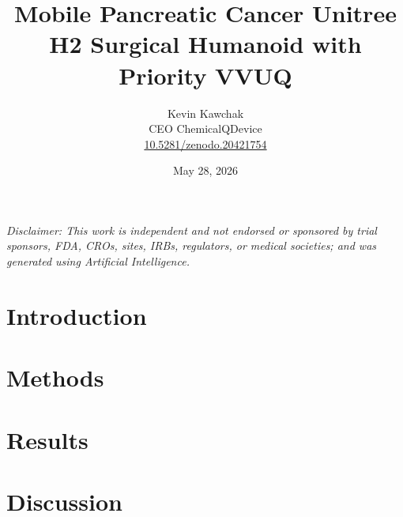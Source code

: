 \documentclass[11pt]{article}
\title{Mobile Pancreatic Cancer Unitree H2 Surgical Humanoid with Priority VVUQ}
\author{
  Kevin Kawchak\hspace{2pt}\orcidicon{0009-0007-5457-8667} \\
  CEO ChemicalQDevice\\
  \href{https://doi.org/10.5281/zenodo.20421754}{10.5281/zenodo.20421754} \\
}
\date{May 28, 2026}
\begin{document}
\maketitle

\begin{abstract}

\end{abstract}

\vspace{0.2em}  
\noindent\footnotesize\textit{Disclaimer: This work is independent and not
endorsed or sponsored by trial sponsors, FDA, CROs, sites, IRBs, regulators, or
medical societies; and was generated using Artificial Intelligence.}
\normalsize 



\vspace{-0.2cm}

\section{Introduction}
\label{sec:introduction}


\tableofcontents
\vspace{0.4cm}

\newpage
\section{Methods}
\label{sec:methods}

\newpage

\section{Results}
\label{sec:results}

\newpage

\section{Discussion}
\label{sec:discussion}

\end{document}
